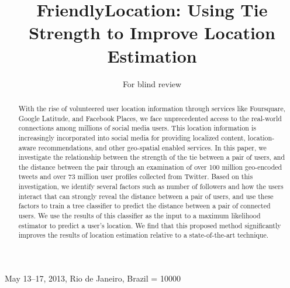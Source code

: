 \documentclass{sig-alternate}
\begin{document}
 {May 13--17, 2013, Rio de Janeiro, Brazil}
\widowpenalty = 10000

\author{
\alignauthor
For blind review
}

\title{FriendlyLocation: Using Tie Strength to Improve Location Estimation}

\maketitle
\begin{abstract}

With the rise of volunteered user location information through services
like Foursquare, Google Latitude, and Facebook Places, we face unprecedented
access to the real-world connections among millions of social media users.
%
This location information is increasingly incorporated into social media for
providing localized content, location-aware recommendations, and other
geo-spatial enabled services.
%
In this paper, we investigate the relationship between the strength of the tie
between a pair of users, and the distance between the pair through an
examination of over 100 million geo-encoded tweets and
over 73 million user profiles collected from Twitter.
%
Based on this investigation, we identify several factors such as number of
followers and how the users interact that can strongly reveal the distance
between a pair of users, and use these factors to train a tree classifier to
predict the distance between a pair of connected users.
%
We use the results of this classifier as the input to a maximum likelihood
estimator to predict a user's location.
%
We find that this proposed method significantly improves the results of
location estimation relative to a state-of-the-art technique.


\end{abstract}









%


\end{document}
